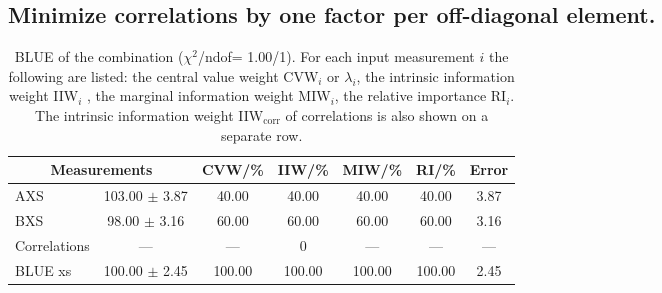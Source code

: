 \subsection{Minimize correlations by one factor per off-diagonal element.}
\begin{table}[H]
\scriptsize
\begin{center}
\renewcommand{\arraystretch}{1.1}
\begin{tabular}{|lc|c|c|c|c|c|}
\hline
\multicolumn{2}{|c|}{Measurements} & CVW/\%  & IIW/\%  & MIW/\%  & RI/\%  & {\tiny Error}\\
\hline
AXS &     103.00 $\pm$       3.87 &      40.00 &      40.00 &      40.00 &      40.00 &       3.87\\
BXS &      98.00 $\pm$       3.16 &      60.00 &      60.00 &      60.00 &      60.00 &       3.16\\
Correlations & --- & --- &  0 & --- & --- & ---\\
\hline
BLUE {\tiny xs} &     100.00 $\pm$       2.45 &     100.00 &     100.00 &     100.00 &     100.00 &       2.45\\
\hline
\end{tabular}
\caption{BLUE of the combination ($\chi^2$/ndof=      1.00/1).
 For each input measurement $i$ the following are listed: the central value weight CVW$_i$ or $\lambda_i$, the intrinsic information weight IIW$_i$ , the marginal information weight MIW$_i$, the relative importance RI$_i$. The intrinsic information weight IIW$_{\mathrm{corr}}$ of correlations is also shown on a separate row.}
\renewcommand{\arraystretch}{1}
\end{center}
\end{table}
